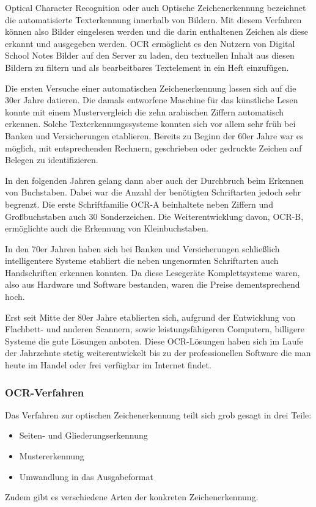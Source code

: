 Optical Character Recognition oder auch Optische Zeichenerkennung bezeichnet die automatisierte Texterkennung innerhalb von Bildern. Mit diesem Verfahren können also Bilder eingelesen werden und die darin enthaltenen Zeichen als diese erkannt und ausgegeben werden. OCR ermöglicht es den Nutzern von Digital School Notes Bilder auf den Server zu laden, den textuellen Inhalt aus diesen Bildern zu filtern und als bearbeitbares Textelement in ein Heft einzufügen.


Die ersten Versuche einer automatischen Zeichenerkennung lassen sich auf die 30er Jahre datieren. Die damals entworfene Maschine für das künstliche Lesen konnte mit einem Mustervergleich die zehn arabischen Ziffern automatisch erkennen. Solche Texterkennungssysteme konnten sich vor allem sehr früh bei Banken und Versicherungen etablieren. Bereits zu Beginn der 60er Jahre war es möglich, mit entsprechenden Rechnern, geschrieben oder gedruckte Zeichen auf Belegen zu identifizieren.

In den folgenden Jahren gelang dann aber auch der Durchbruch beim Erkennen von Buchstaben. Dabei war die Anzahl der benötigten Schriftarten jedoch sehr begrenzt. Die erste Schriftfamilie OCR-A beinhaltete neben Ziffern und Großbuchstaben auch 30 Sonderzeichen. Die Weiterentwicklung davon, OCR-B, ermöglichte auch die Erkennung von Kleinbuchstaben.

In den 70er Jahren haben sich bei Banken und Versicherungen schließlich intelligentere Systeme etabliert die neben ungenormten Schriftarten auch Handschriften erkennen konnten. Da diese Lesegeräte Komplettsysteme waren, also aus Hardware und Software bestanden, waren die Preise dementsprechend hoch.

Erst seit Mitte der 80er Jahre etablierten sich, aufgrund der Entwicklung von Flachbett- und anderen Scannern, sowie leistungsfähigeren Computern, billigere Systeme die gute Lösungen anboten. Diese OCR-Lösungen haben sich im Laufe der Jahrzehnte stetig weiterentwickelt bis zu der professionellen Software die man heute im Handel oder frei verfügbar im Internet findet.

\subsubsection{OCR-Verfahren}
Das Verfahren zur optischen Zeichenerkennung teilt sich grob gesagt in drei Teile:
\begin{itemize}
\item Seiten- und Gliederungserkennung
\item Mustererkennung
\item Umwandlung in das Ausgabeformat
\end{itemize}
Zudem gibt es verschiedene Arten der konkreten Zeichenerkennung.

